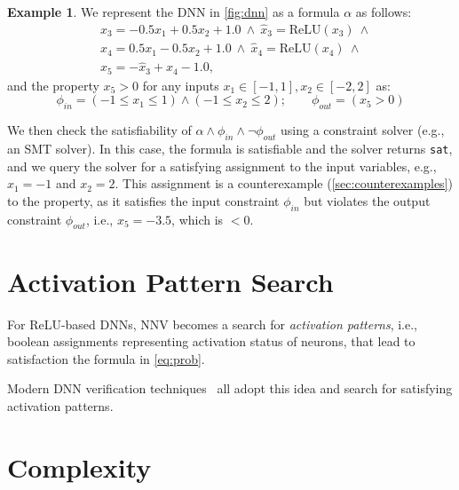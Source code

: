 \documentclass[oneside,11pt,dvipsnames]{book}
\numberwithin{equation}{section}
\theoremstyle{definition}
\newtheorem{example}{Example}[section]
\theoremstyle{remark}
\newcommand{\tvn}[1]{\iftoggle{usecomment}{{\color{red}{[TVN]: #1}}}{}}
\newcommand{\hai}[1]{\iftoggle{usecomment}{{\color{blue}{[HD]: #1}}}{}}
\newcommand{\relu}[1]{\mathrm{ReLU}\left(#1\right)}
\newcommand{\sat}{\texttt{sat}}
\begin{document}
\begin{example}\label{ex:dnn-sat}
We represent the DNN in \autoref{fig:dnn} as a formula $\alpha$ as follows:
\begin{align*}
& x_3 = -0.5x_1 + 0.5x_2 + 1.0 ~\land~ \hat{x}_3 = \relu{x_3} ~\land \\
& x_4 = 0.5x_1 - 0.5x_2 + 1.0  ~\land~ \hat{x}_4 = \relu{x_4} ~\land \\
& x_5 = -\hat{x}_3 + \hat{x}_4 - 1.0,
\end{align*}
\noindent and the property $x_5 > 0$ for any inputs $x_1 \in [-1,1], x_2\in[-2,2]$ as:
\begin{equation*}
\phi_{in} = (-1 \le x_1 \le 1) \land (-1 \le x_2 \le 2); \qquad
\phi_{out} = (x_5 > 0)
\end{equation*}

We then check the satisfiability of $\alpha \land \phi_{in} \land \neg \phi_{out}$ using a constraint solver (e.g., an SMT solver).  In this case, the formula is satisfiable and the solver returns \sat{}, and we query the solver for a satisfying assignment to the input variables, e.g., $x_1=-1$ and $x_2=2$. This assignment is a counterexample (\autoref{sec:counterexamples}) to the property, as it satisfies the input constraint $\phi_{in}$ but violates the output constraint $\phi_{out}$, i.e., $x_5 = -3.5$, which is  $< 0$.

\end{example}

\section{Activation Pattern Search}\label{sec:activation-pattern}
 For ReLU-based DNNs, NNV becomes a search for \emph{activation patterns}, i.e., boolean assignments representing activation status of neurons, that lead to satisfaction the formula in \autoref{eq:prob}. 

Modern DNN verification techniques~\cite{bunel2020branch,wang2021beta,ferrari2022complete,duong2024harnessing,duong2023dpllt,ovalbab,katz2019marabou,bak2021nnenum} all adopt this idea and search for satisfying activation patterns.

\tvn{example of activation pattern search? using the above DNN example}
\hai{I will pull the example from our paper, but I think we also should create a tree to demonstrate how it proceeds -- I will work on this}
\section{Complexity}\label{sec:complexity}
\end{document}
